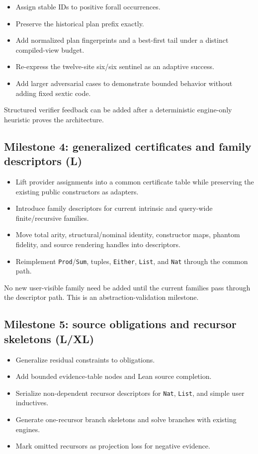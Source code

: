 \documentclass[11pt]{article}
\newcommand{\code}[1]{\texttt{#1}}
\begin{document}
\begin{itemize}
  \item Assign stable IDs to positive forall occurrences.
  \item Preserve the historical plan prefix exactly.
  \item Add normalized plan fingerprints and a best-first tail under a distinct
    compiled-view budget.
  \item Re-express the twelve-site six/six sentinel as an adaptive success.
  \item Add larger adversarial cases to demonstrate bounded behavior without
    adding fixed sextic code.
\end{itemize}

Structured verifier feedback can be added after a deterministic engine-only
heuristic proves the architecture.

\subsection{Milestone 4: generalized certificates and family descriptors (L)}

\begin{itemize}
  \item Lift provider assignments into a common certificate table while
    preserving the existing public constructors as adapters.
  \item Introduce family descriptors for current intrinsic and query-wide
    finite/recursive families.
  \item Move total arity, structural/nominal identity, constructor maps,
    phantom fidelity, and source rendering handles into descriptors.
  \item Reimplement \code{Prod}/\code{Sum}, tuples, \code{Either}, \code{List},
    and \code{Nat} through the common path.
\end{itemize}

No new user-visible family need be added until the current families pass
through the descriptor path.  This is an abstraction-validation milestone.

\subsection{Milestone 5: source obligations and recursor skeletons (L/XL)}

\begin{itemize}
  \item Generalize residual constraints to obligations.
  \item Add bounded evidence-table nodes and Lean source completion.
  \item Serialize non-dependent recursor descriptors for \code{Nat},
    \code{List}, and simple user inductives.
  \item Generate one-recursor branch skeletons and solve branches with existing
    engines.
  \item Mark omitted recursors as projection loss for negative evidence.
\end{itemize}
\end{document}
